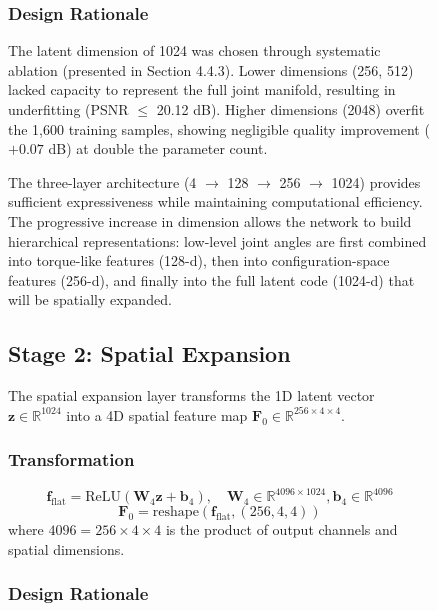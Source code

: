 \documentclass[12pt,a4paper,oneside]{report}
\begin{document}
\begin{figure}[H]
\subsubsection{Design Rationale}

The latent dimension of 1024 was chosen through systematic ablation (presented in Section 4.4.3). Lower dimensions (256, 512) lacked capacity to represent the full joint manifold, resulting in underfitting (PSNR $\leq$ 20.12 dB). Higher dimensions (2048) overfit the 1,600 training samples, showing negligible quality improvement ($+0.07$ dB) at double the parameter count.

The three-layer architecture (4 $\rightarrow$ 128 $\rightarrow$ 256 $\rightarrow$ 1024) provides sufficient expressiveness while maintaining computational efficiency. The progressive increase in dimension allows the network to build hierarchical representations: low-level joint angles are first combined into torque-like features (128-d), then into configuration-space features (256-d), and finally into the full latent code (1024-d) that will be spatially expanded.

\subsection{Stage 2: Spatial Expansion}

The spatial expansion layer transforms the 1D latent vector $\mathbf{z} \in \mathbb{R}^{1024}$ into a 4D spatial feature map $\mathbf{F}_0 \in \mathbb{R}^{256 \times 4 \times 4}$.

\subsubsection{Transformation}

\begin{equation}
\mathbf{f}_{\text{flat}} = \text{ReLU}(\mathbf{W}_4 \mathbf{z} + \mathbf{b}_4), \quad \mathbf{W}_4 \in \mathbb{R}^{4096 \times 1024}, \mathbf{b}_4 \in \mathbb{R}^{4096}
\end{equation}
\begin{equation}
\mathbf{F}_0 = \text{reshape}(\mathbf{f}_{\text{flat}}, (256, 4, 4))
\end{equation}
where $4096 = 256 \times 4 \times 4$ is the product of output channels and spatial dimensions.

\subsubsection{Design Rationale}


\end{figure}
\end{document}
